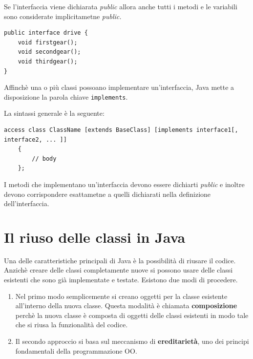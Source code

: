 \documentclass[12pt]{report}
\begin{document}
Se l'interfaccia viene dichiarata \textit{public} allora anche tutti i metodi e le variabili sono considerate implicitametne \textit{public.}
\begin{example}{}{}
\begin{lstlisting}[style=javastyle]
public interface drive {
	void firstgear();
	void secondgear();
	void thirdgear();
}
\end{lstlisting}
Affinchè una o più classi possoano implementare un'interfaccia, Java mette a disposizione la parola chiave \texttt{implements}.

La sintassi generale è la seguente:
\begin{lstlisting}[style=javastyle]
	access class ClassName [extends BaseClass] [implements interface1[, interface2, ... ]]
	{
		// body
	};
\end{lstlisting}
\end{example}
I metodi che implementano un'interfaccia devono essere dichiarti \textit{public} e inoltre devono corrispondere esattametne a quelli dichiarati nella definizione dell'interfaccia.
\section{Il riuso delle classi in Java}
Una delle caratteristiche principali di Java è la possibilità di riusare il codice. Anzichè creare delle classi completamente nuove si possono usare delle classi esistenti che sono già implementate e testate. Esistono due modi di procedere.
\begin{enumerate}
	\item Nel primo modo semplicemente si creano oggetti per la classe esistente all'interno della nuova classe. Questa modalità è chiamata \textbf{composizione} perchè la nuova classe è composta di oggetti delle classi esistenti in modo tale che si riusa la funzionalità del codice.
	\item Il secondo approccio si basa sul meccanismo di \textbf{ereditarietà}, uno dei principi fondamentali della programmazione OO.
\end{enumerate}
\end{document}

